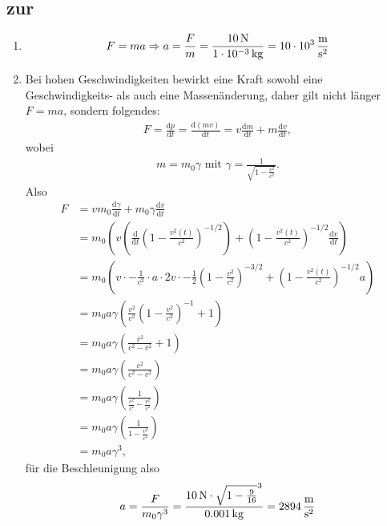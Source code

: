 \documentclass[a4paper]{scrartcl}
\begin{document}
\subsection{zur }
\label{lsg:Relativitaetstheorie}
\begin{enumerate}[noitemsep]
  \item
    \begin{equation*}
      F = ma \Rightarrow a = \frac{F}{m} = \frac{\unit[10]{N}}{\unit[1 \cdot 10^{-3}]{kg}} = \unit[10 \cdot 10^3]{\frac{m}{s^2}}
    \end{equation*}
  \item Bei hohen Geschwindigkeiten bewirkt eine Kraft sowohl eine Geschwindigkeits- als auch eine Massenänderung, daher gilt nicht länger $F = ma$, sondern folgendes:
    \begin{align*}
      F = \frac{\text{d}p}{\text{d}t} = \frac{\text{d}(mv)}{\text{d}t} = v\frac{\text{d}m}{\text{d}t} + m\frac{\text{d}v}{\text{d}t},
    \end{align*}
    wobei
    \begin{align*}
      m = m_0\gamma \text{ mit } \gamma = \frac{1}{\sqrt{1-\frac{v^2}{c^2}}}.
    \end{align*} Also
    \begin{align*}
      F & = v m_0 \frac{\text{d}\gamma}{\text{d}t} + m_0\gamma \frac{\text{d}v}{\text{d}t}\\
      & = m_0\left( v \left( \frac{\text{d}}{\text{d}t} \left( 1-\frac{v^2(t)}{c^2} \right)^{-1/2}\right) +  \left( 1-\frac{v^2(t)}{c^2} \right)^{-1/2} \frac{\text{d}v}{\text{d}t}\right)\\
      &= m_0 \left( v \cdot -\frac{1}{c^2} \cdot a \cdot 2v \cdot -\frac{1}{2} \left( 1-\frac{v^2}{c^2} \right)^{-3/2} + \left( 1-\frac{v^2(t)}{c^2} \right)^{-1/2} a\right)\\
      &= m_0 a \gamma \left(  \frac{v^2}{c^2} \left( 1-\frac{v^2}{c^2} \right)^{-1} + 1\right)\\
      &= m_0a\gamma \left( \frac{v^2}{c^2-v^2} + 1 \right)\\
      &= m_0a\gamma \left( \frac{c^2}{c^2-v^2} \right)\\
      &= m_0a\gamma \left( \frac{1}{\frac{c^2}{c^2} - \frac{v^2}{c^2}} \right)\\
      &= m_0a\gamma \left( \frac{1}{1 - \frac{v^2}{c^2}} \right)\\
      &= m_0a\gamma^3,
    \end{align*}
    für die Beschleunigung also
    \begin{align*}
      a = \frac{F}{m_0\gamma^3} = \frac{\unit[10]{N}\cdot \sqrt{1-\frac{9}{16}}^3}{\unit[0.001]{kg}} = \unit[2894]{\frac{m}{s^2}}
    \end{align*}

\end{enumerate}
\end{document}
